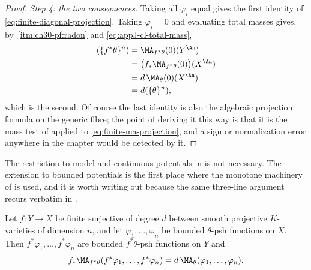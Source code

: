 \begin{proof}
\emph{Step 4: the two consequences.}  Taking all $\varphi_i$ equal gives
the first identity of \eqref{eq:finite-diagonal-projection}.  Taking
$\varphi_i=0$ and evaluating total masses gives, by
\,\cref{itm:ch30-pf:radon} and
\eqref{eq:appJ-cl-total-mass},
\[
 \begin{aligned}
 (\{f^*\theta\}^n)
 &=\MA_{f^*\theta}(0)(Y^{\An})\\
 &=\bigl(f_*\MA_{f^*\theta}(0)\bigr)(X^{\An})\\
 &=d\,\MA_\theta(0)(X^{\An})\\
 &=d(\{\theta\}^n),
 \end{aligned}
\]
which is the second.  Of course the last identity is also the algebraic
projection formula on the generic fibre; the point of deriving it this way
is that it is the mass test of  applied to
\eqref{eq:finite-ma-projection}, and a sign or normalization error anywhere
in the chapter would be detected by it.
\end{proof}

The restriction to model and continuous potentials in
 is not necessary.  The extension to bounded
potentials is the first place where the monotone machinery of
 is used, and it is worth writing out because the same
three-line argument recurs verbatim in
.

\begin{theorem}
\label{thm:ch30-finite-bounded-projection}
Let $f:Y\to X$ be finite surjective of degree $d$ between smooth
projective $K$-varieties of dimension $n$, and let
$\varphi_1,\ldots,\varphi_n$ be bounded $\theta$-psh functions on
$X$.  Then $f^*\varphi_1,\ldots,f^*\varphi_n$ are bounded
$f^*\theta$-psh functions on $Y$ and
\begin{equation}
\label{eq:ch30-bounded-projection}
 f_*\MA_{f^*\theta}(f^*\varphi_1,\ldots,f^*\varphi_n)
 =d\,\MA_\theta(\varphi_1,\ldots,\varphi_n).
\end{equation}
\end{theorem}

